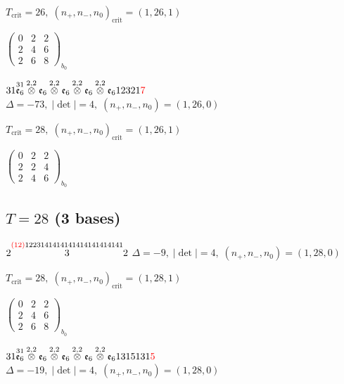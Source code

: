 \documentclass[10pt]{article}
\begin{document}
\hspace{1em}$T_{\text{crit}}=26,\; (n_+,n_-,n_0)_{\text{crit}}=(1,26,1)$

\hspace{2em}$\left(\begin{smallmatrix}0 & 2 & 2 \\ 2 & 4 & 6 \\ 2 & 6 & 8\end{smallmatrix}\right)_{\!b_0}$

$31\overset{31}{\mathfrak{e}_6}\overset{2,2}{\otimes}\mathfrak{e}_6\overset{2,2}{\otimes}\mathfrak{e}_6\overset{2,2}{\otimes}\mathfrak{e}_6\overset{2,2}{\otimes}\mathfrak{e}_612321\textcolor{red}{7}$ \quad $\Delta=-73,\; |\det|=4,\; (n_+,n_-,n_0)=(1,26,0)$

\hspace{1em}$T_{\text{crit}}=28,\; (n_+,n_-,n_0)_{\text{crit}}=(1,26,1)$

\hspace{2em}$\left(\begin{smallmatrix}0 & 2 & 2 \\ 2 & 2 & 4 \\ 2 & 4 & 6\end{smallmatrix}\right)_{\!b_0}$


\subsection*{$T = 28$ \quad (3 bases)}
\smallskip

$2\overset{\textcolor{red}{(12)}1223141414141414141414141}{3}2$ \quad $\Delta=-9,\; |\det|=4,\; (n_+,n_-,n_0)=(1,28,0)$

\hspace{1em}$T_{\text{crit}}=28,\; (n_+,n_-,n_0)_{\text{crit}}=(1,28,1)$

\hspace{2em}$\left(\begin{smallmatrix}0 & 2 & 2 \\ 2 & 4 & 6 \\ 2 & 6 & 8\end{smallmatrix}\right)_{\!b_0}$

\smallskip

$31\overset{31}{\mathfrak{e}_6}\overset{2,2}{\otimes}\mathfrak{e}_6\overset{2,2}{\otimes}\mathfrak{e}_6\overset{2,2}{\otimes}\mathfrak{e}_6\overset{2,2}{\otimes}\mathfrak{e}_61315131\textcolor{red}{5}$ \quad $\Delta=-19,\; |\det|=4,\; (n_+,n_-,n_0)=(1,28,0)$
\end{document}
